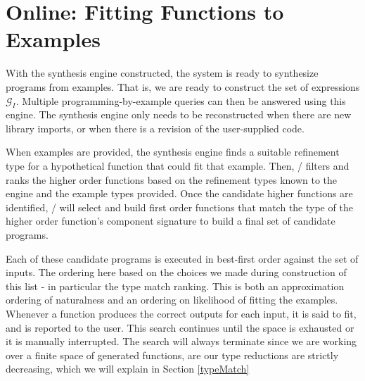 \section{Online: Fitting Functions to Examples} \label{synth}

With the synthesis engine constructed, the system is ready to synthesize programs from examples.
That is, we are ready to construct the set of expressions $\mathcal{G}_I$.
Multiple programming-by-example queries can then be answered using this engine.
The synthesis engine only needs to be reconstructed when there are new library imports, or when there is a revision of the user-supplied code.

When examples are provided, the synthesis engine finds a suitable refinement type for a hypothetical function that could fit that example.
Then, \ourTool/ filters and ranks the higher order functions based on the refinement types known to the engine and the example types provided.
Once the candidate higher functions are identified, \ourTool/ will select and build first order functions that match the type of the higher order function's component signature to build a final set of candidate programs.

Each of these candidate programs is executed in best-first order against the set of inputs.
The ordering here based on the choices we made during construction of this list - in particular the type match ranking.
This is both an approximation ordering of naturalness and an ordering on likelihood of fitting the examples.
Whenever a function produces the correct outputs for each input, it is said to fit, and is reported to the user.
This search continues until the space is exhausted or it is manually interrupted.
The search will always terminate since we are working over a finite space of generated functions, are our type reductions are strictly decreasing, which we will explain in Section \ref{typeMatch}






